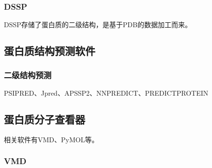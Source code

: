 \subsubsection{DSSP}

DSSP存储了蛋白质的二级结构，是基于PDB的数据加工而来。

\subsection{蛋白质结构预测软件}

\subsubsection{二级结构预测}

PSIPRED、Jpred、APSSP2、NNPREDICT、PREDICTPROTEIN

\subsection{蛋白质分子查看器}

相关软件有VMD、PyMOL等。

\subsubsection{VMD}

